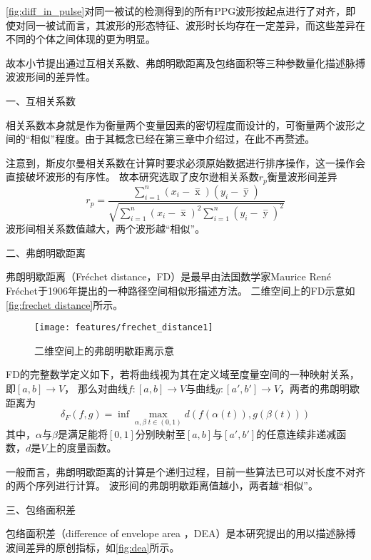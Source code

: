 \autoref{fig:diff_in_pulse}对同一被试的检测得到的所有PPG波形按起点进行了对齐，即使对同一被试而言，其波形的形态特征、波形时长均存在一定差异，而这些差异在不同的个体之间体现的更为明显。

故本小节提出通过互相关系数、弗朗明歇距离及包络面积等三种参数量化描述脉搏波波形间的差异性。

一、互相关系数

相关系数本身就是作为衡量两个变量因素的密切程度而设计的，可衡量两个波形之间的“相似”程度。由于其概念已经在第三章中介绍过，在此不再赘述。

注意到，斯皮尔曼相关系数在计算时要求必须原始数据进行排序操作，这一操作会直接破坏波形的有序性。
故本研究选取了皮尔逊相关系数$r_p$衡量波形间差异
\begin{equation}
    \label{equ:pearson2}
    r_p=\frac{\sum_{i=1}^n{(x_i- \mathop{x} \limits^-)(y_i- \mathop{y} \limits^-)}}{\sqrt{{\sum_{i=1}^n}{{(x_i- \mathop{x} \limits^-)^2\sum_{i=1}^n}{(y_i- \mathop{y} \limits^-)^2}}}}
\end{equation}
波形间相关系数值越大，两个波形越“相似”。

二、弗朗明歇距离

弗朗明歇距离（Fréchet distance，FD）是最早由法国数学家Maurice René Fréchet于1906年提出的一种路径空间相似形描述方法\cite{Wien1994,Kaveh2013,GN2017}。
二维空间上的FD示意如\autoref{fig:frechet distance}所示。

\begin{figure}[htbp]
  \centering
  \texttt{[image: features/frechet\_distance1]}
  \caption{\label{fig:frechet distance}二维空间上的弗朗明歇距离示意}
\end{figure}

FD的完整数学定义如下，若将曲线视为其在定义域至度量空间的一种映射关系，即$[a,b]\rightarrow V$，
那么对曲线$f:[a,b]\rightarrow V$与曲线$g:[a',b']\rightarrow V$，两者的弗朗明歇距离为
\begin{equation}
    \label{equ:frechet distance}
    \delta_F(f,g)=\inf \max \limits_{\alpha,\beta \; t \in (0,1)} d(f(\alpha(t)), g(\beta(t)))
\end{equation}
其中，$\alpha$与$\beta$是满足能将$[0,1]$分别映射至$[a,b]$与$[a',b']$的任意连续非递减函数，$d$是$V$上的度量函数\cite{Wien1994}。

一般而言，弗朗明歇距离的计算是个递归过程，目前一些算法已可以对长度不对齐的两个序列进行计算\cite{derohde2022}。
波形间的弗朗明歇距离值越小，两者越“相似”。

三、包络面积差

包络面积差（difference of envelope area ，DEA）是本研究提出的用以描述脉搏波间差异的原创指标，如\autoref{fig:dea}所示。

